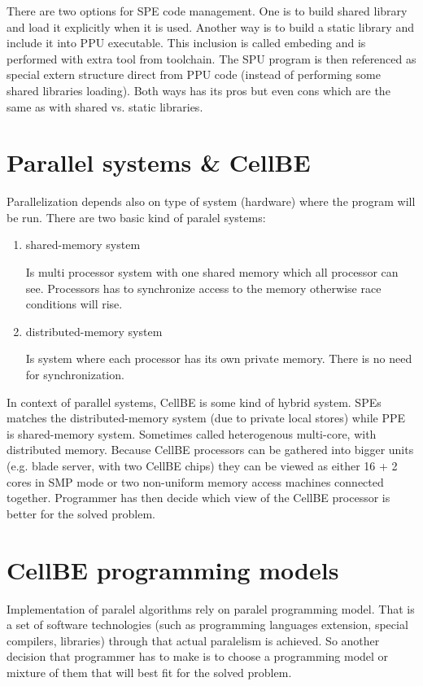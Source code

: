 \par
There are two options for SPE code management. One is to build shared library and load it explicitly when it is used. Another way is to build a static library and include it into PPU executable. This inclusion is called embeding and is performed with extra tool from toolchain. The SPU program is then referenced as special extern structure direct from PPU code (instead of performing some shared libraries loading). Both ways has its pros but even cons which are the same as with shared vs. static libraries.

\section{Parallel systems \& CellBE}

Parallelization depends also on type of system (hardware) where the program will be run. There are two basic kind of paralel systems:
\begin{enumerate}
\item {shared-memory system}
\par
Is multi processor system with one shared memory which all processor can see. Processors has to synchronize access to the memory otherwise race conditions will rise.

\item {distributed-memory system}
\par
Is system where each processor has its own private memory. There is no need for synchronization.
\end{enumerate}

In context of parallel systems, CellBE is some kind of hybrid system. SPEs matches the distributed-memory system (due to private local stores) while PPE is shared-memory system. Sometimes called heterogenous multi-core, with distributed memory. Because CellBE processors can be gathered into bigger units (e.g. blade server, with two CellBE chips) they can be viewed as either 16 + 2 cores in SMP mode or two non-uniform memory access machines connected together. Programmer has then decide which view of the CellBE processor is better for the solved problem.

\section{CellBE programming models}

Implementation of paralel algorithms rely on paralel programming model. That is a set of software technologies (such as programming languages extension, special compilers, libraries) through that actual paralelism is achieved. So another decision that programmer has to make is to choose a programming model or mixture of them that will best fit for the solved problem.

